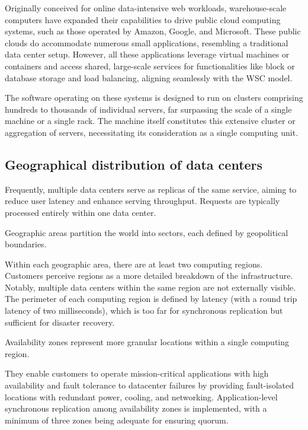 Originally conceived for online data-intensive web workloads, warehouse-scale computers have expanded their capabilities to drive public cloud computing systems, such as those operated by Amazon, Google, and Microsoft. 
These public clouds do accommodate numerous small applications, resembling a traditional data center setup. 
However, all these applications leverage virtual machines or containers and access shared, large-scale services for functionalities like block or database storage and load balancing, aligning seamlessly with the WSC model.

The software operating on these systems is designed to run on clusters comprising hundreds to thousands of individual servers, far surpassing the scale of a single machine or a single rack. 
The machine itself constitutes this extensive cluster or aggregation of servers, necessitating its consideration as a single computing unit.

\subsection{Geographical distribution of data centers}
Frequently, multiple data centers serve as replicas of the same service, aiming to reduce user latency and enhance serving throughput. 
Requests are typically processed entirely within one data center.

\begin{definition}
    Geographic areas partition the world into sectors, each defined by geopolitical boundaries. 
\end{definition}

Within each geographic area, there are at least two computing regions.
Customers perceive regions as a more detailed breakdown of the infrastructure. 
Notably, multiple data centers within the same region are not externally visible. 
The perimeter of each computing region is defined by latency (with a round trip latency of two milliseconds), which is too far for synchronous replication but sufficient for disaster recovery.

\begin{definition}
    Availability zones represent more granular locations within a single computing region.
\end{definition}

They enable customers to operate mission-critical applications with high availability and fault tolerance to datacenter failures by providing fault-isolated locations with redundant power, cooling, and networking.
Application-level synchronous replication among availability zones is implemented, with a minimum of three zones being adequate for ensuring quorum.

